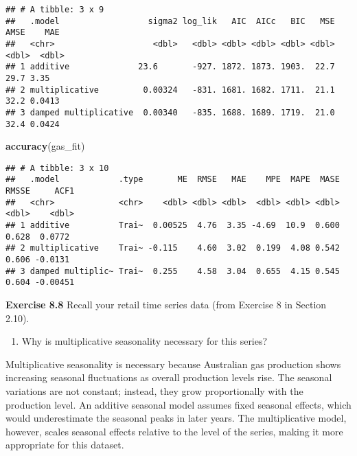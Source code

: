 \documentclass[
]{article}
\newenvironment{Shaded}{\begin{snugshade}}{\end{snugshade}}
\newcommand{\FunctionTok}[1]{\textcolor[rgb]{0.13,0.29,0.53}{\textbf{#1}}}
\newcommand{\NormalTok}[1]{#1}
\providecommand{\tightlist}{%
  \setlength{\itemsep}{0pt}\setlength{\parskip}{0pt}}
\begin{document}
\begin{verbatim}
## # A tibble: 3 x 9
##   .model                  sigma2 log_lik   AIC  AICc   BIC   MSE  AMSE    MAE
##   <chr>                    <dbl>   <dbl> <dbl> <dbl> <dbl> <dbl> <dbl>  <dbl>
## 1 additive              23.6       -927. 1872. 1873. 1903.  22.7  29.7 3.35  
## 2 multiplicative         0.00324   -831. 1681. 1682. 1711.  21.1  32.2 0.0413
## 3 damped multiplicative  0.00340   -835. 1688. 1689. 1719.  21.0  32.4 0.0424
\end{verbatim}

\begin{Shaded}
\begin{Highlighting}[]
\FunctionTok{accuracy}\NormalTok{(gas\_fit)}
\end{Highlighting}
\end{Shaded}

\begin{verbatim}
## # A tibble: 3 x 10
##   .model            .type       ME  RMSE   MAE    MPE  MAPE  MASE RMSSE     ACF1
##   <chr>             <chr>    <dbl> <dbl> <dbl>  <dbl> <dbl> <dbl> <dbl>    <dbl>
## 1 additive          Trai~  0.00525  4.76  3.35 -4.69  10.9  0.600 0.628  0.0772 
## 2 multiplicative    Trai~ -0.115    4.60  3.02  0.199  4.08 0.542 0.606 -0.0131 
## 3 damped multiplic~ Trai~  0.255    4.58  3.04  0.655  4.15 0.545 0.604 -0.00451
\end{verbatim}

\textbf{Exercise 8.8} Recall your retail time series data (from Exercise
8 in Section 2.10).

\begin{enumerate}
\def\labelenumi{\alph{enumi}.}
\tightlist
\item
  Why is multiplicative seasonality necessary for this series?
\end{enumerate}

Multiplicative seasonality is necessary because Australian gas
production shows increasing seasonal fluctuations as overall production
levels rise. The seasonal variations are not constant; instead, they
grow proportionally with the production level. An additive seasonal
model assumes fixed seasonal effects, which would underestimate the
seasonal peaks in later years. The multiplicative model, however, scales
seasonal effects relative to the level of the series, making it more
appropriate for this dataset.
\end{document}
